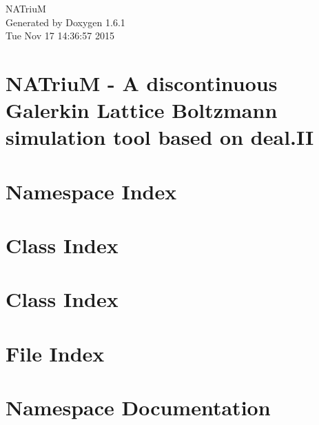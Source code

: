 \documentclass[a4paper]{book}
\begin{document}
\hypersetup{pageanchor=false}
\begin{titlepage}
\vspace*{7cm}
\begin{center}
{\Large NATriuM }\\
\vspace*{1cm}
{\large Generated by Doxygen 1.6.1}\\
\vspace*{0.5cm}
{\small Tue Nov 17 14:36:57 2015}\\
\end{center}
\end{titlepage}
\clearemptydoublepage
{}
\tableofcontents
\clearemptydoublepage
{}
\hypersetup{pageanchor=true}
\chapter{NATriuM -\/ A discontinuous Galerkin Lattice Boltzmann simulation tool based on deal.II}
\label{index}\hypertarget{index}{}
\chapter{Namespace Index}

\chapter{Class Index}

\chapter{Class Index}

\chapter{File Index}

\chapter{Namespace Documentation}


\end{document}
